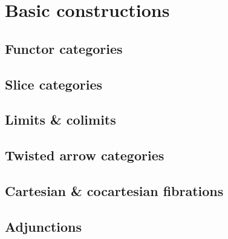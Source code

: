 
\section{Basic constructions}%
\label{sec:Basicconstructions}

\subsection{Functor categories}%
\label{sub:Functorcategories}

\subsection{Slice categories}%
\label{sub:Slicecategories}

\subsection{Limits \& colimits}%
\label{sub:Limitscolimits}

\subsection{Twisted arrow categories}%
\label{sub:Twistedarrowcategories}

\subsection{Cartesian \& cocartesian fibrations}%
\label{sub:Cartesiancocartesianfibrations}

\subsection{Adjunctions}%
\label{sub:Adjunctions}



